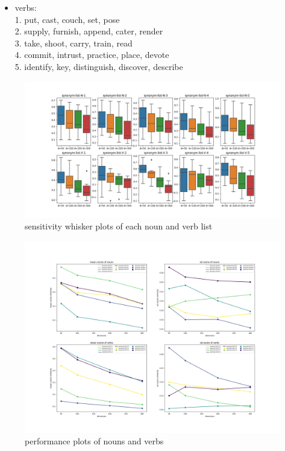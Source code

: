 \documentclass{article} %
\begin{document}
\begin{itemize}
\begin{itemize}
		\item verbs: \\
		1. put, cast, couch, set, pose\\
		2. supply, furnish, append, cater, render\\
		3. take, shoot, carry, train, read\\
		4. commit, intrust, practice, place, devote\\
		5. identify, key, distinguish, discover, describe
	\end{itemize}


\end{itemize}


\begin{figure}[H]
	\centering
	\includegraphics[width=0.9\linewidth]{../whiskerplot}
	\caption{sensitivity whisker plots of each noun and verb list}
	\label{fig:whiskerplot}
\end{figure}



\begin{figure}[H]
	\centering
	\includegraphics[width=1.1\linewidth]{../mean_sd}
	\caption{performance plots of nouns and verbs}
	\label{fig:meansd}
\end{figure}
\end{document}
